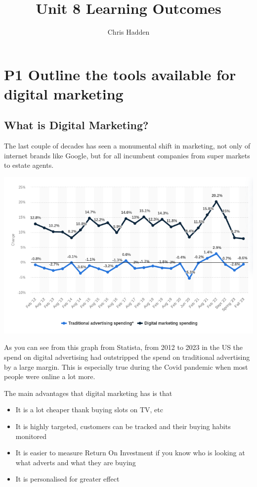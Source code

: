 \documentclass{article}
\begin{document}
\title{Unit 8 Learning Outcomes}
\author{Chris Hadden}
\date{}
\maketitle

\section{P1 Outline the tools available for digital marketing}

\subsection{What is Digital Marketing?}
The last couple of decades has seen a monumental shift in marketing, not only of internet brands like Google, but for all incumbent companies from super markets to estate agents.

\includegraphics[scale=0.5]{TraditionalVsDigitalMarketing}

As you can see from this graph from Statista, from 2012 to 2023 in the US the spend on digital advertising had outstripped the spend on traditional advertising by a large margin. This is especially true during the Covid pandemic when most people were online a lot more.

The main advantages that digital marketing has is that 
\begin{itemize}
\item It is a lot cheaper thank buying slots on TV, etc
\item It is highly targeted, customers can be tracked and their buying habits monitored
\item It is easier to measure Return On Investment if you know who is looking at what adverts and what they are buying
\item It is personalised for greater effect
\end{itemize}
\end{document}
